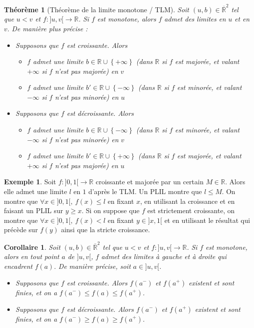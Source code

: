 \documentclass[french]{book}
\newcommand{\R}{\mathbb{R}}
\theoremstyle{plain}
\newtheorem{thm}{Théorème}[chapter]
\newtheorem{cor}{Corollaire}[chapter]
\theoremstyle{definition}
\newtheorem{exa}{Exemple}[chapter]
\theoremstyle{remark}
\begin{document}
\begin{thm}[Théorème de la limite monotone / TLM]
	Soit $(u,b)\in\overline{\R}^2$ tel que $u<v$ et $f:]u,v[\rightarrow\R$. Si $f$ est monotone, alors $f$ admet des limites en $u$ et en $v$. De manière plus précise : 
	\begin{itemize}
		\item Supposons que $f$ est croissante. Alors 
		\begin{itemize}
			\item[--] $f$ admet une limite $b\in\R\cup\left\{+\infty\right\}$ (dans $\R$ si $f$ est majorée, et valant $+\infty$ si $f$ n'est pas majorée) en $v$
			\item[--] $f$ admet une limite $b'\in\R\cup\left\{-\infty\right\}$ (dans $\R$ si $f$ est minorée, et valant $-\infty$ si $f$ n'est pas minorée) en $u$
		\end{itemize}
		\item Supposons que $f$ est décroissante. Alors 
		\begin{itemize}
			\item[--] $f$ admet une limite $b\in\R\cup\left\{-\infty\right\}$ (dans $\R$ si $f$ est minorée, et valant $-\infty$ si $f$ n'est pas minorée) en $v$
			\item[--] $f$ admet une limite $b'\in\R\cup\left\{+\infty\right\}$ (dans $\R$ si $f$ est majorée, et valant $+\infty$ si $f$ n'est pas majorée) en $u$
		\end{itemize}
	\end{itemize}
\end{thm}
\begin{exa}
	Soit $f:]0,1[\rightarrow\R$ croissante et majorée par un certain $M\in\R$. Alors elle admet une limite $l$ en $1$ d'après le TLM. Un PLIL montre que $l\leqslant M$. On montre que $\forall x\in]0,1[,\ f(x)\leqslant l$ en fixant $x$, en utilisant la croissance et en faisant un PLIL sur $y\geqslant x$. Si on suppose que $f$ est strictement croissante, on montre que $\forall x\in]0,1[,\ f(x)<l$ en fixant $y\in]x,1[$ et en utilisant le résultat qui précède sur $f(y)$ ainsi que la stricte croissance.
\end{exa}
\begin{cor}
	Soit $(u,b)\in\overline{\R}^2$ tel que $u<v$ et $f:]u,v[\rightarrow\R$. Si $f$ est monotone, alors en tout point $a$ de $]u,v[$, $f$ admet des limites à gauche et à droite qui encadrent $f(a)$. De manière précise, soit $a\in]u,v[$.
	\begin{itemize}
		\item Supposons que $f$ est croissante. Alors $f(a^-)$ et $f(a^+)$ existent et sont finies, et on a $f(a^-)\leqslant f(a)\leqslant f(a^+)$.
		\item Supposons que $f$ est décroissante. Alors $f(a^-)$ et $f(a^+)$ existent et sont finies, et on a $f(a^-)\geqslant f(a)\geqslant f(a^+)$.
	\end{itemize}
\end{cor}
\end{document}
